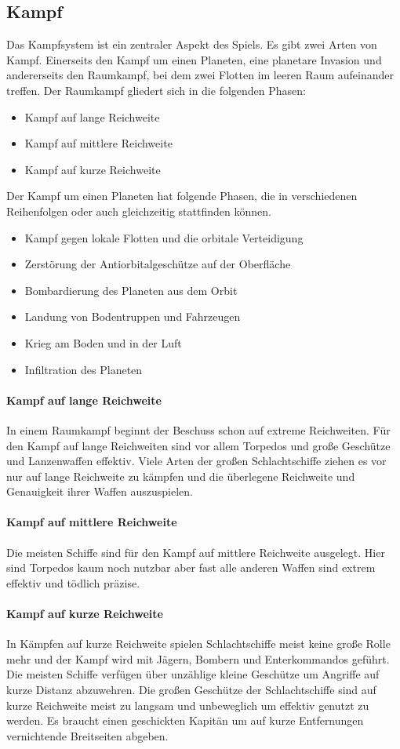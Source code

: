 \documentclass[11pt, a4paper]{article}
\begin{document}
\subsection{Kampf}
Das Kampfsystem ist ein zentraler Aspekt des Spiels. Es gibt zwei Arten von Kampf. Einerseits den Kampf um 
einen Planeten, eine planetare Invasion und andererseits den Raumkampf, bei dem zwei Flotten im leeren Raum
aufeinander treffen. Der Raumkampf gliedert sich in die folgenden Phasen:
\begin{itemize}
    \item Kampf auf lange Reichweite
    \item Kampf auf mittlere Reichweite
    \item Kampf auf kurze Reichweite
\end{itemize}
%
Der Kampf um einen Planeten hat folgende Phasen, die in verschiedenen Reihenfolgen oder auch gleichzeitig
stattfinden können.
\begin{itemize}
    \item Kampf gegen lokale Flotten und die orbitale Verteidigung
    \item Zerstörung der Antiorbitalgeschütze auf der Oberfläche
    \item Bombardierung des Planeten aus dem Orbit
    \item Landung von Bodentruppen und Fahrzeugen
    \item Krieg am Boden und in der Luft
    \item Infiltration des Planeten
\end{itemize}
%
\paragraph{Kampf auf lange Reichweite}
In einem Raumkampf beginnt der Beschuss schon auf extreme Reichweiten. Für den Kampf auf lange Reichweiten
sind vor allem Torpedos und große Geschütze und Lanzenwaffen effektiv. Viele Arten der großen Schlachtschiffe
ziehen es vor nur auf lange Reichweite zu kämpfen und die überlegene Reichweite und Genauigkeit ihrer Waffen
auszuspielen. 
%
\paragraph{Kampf auf mittlere Reichweite}
Die meisten Schiffe sind für den Kampf auf mittlere Reichweite ausgelegt. Hier sind Torpedos kaum noch nutzbar
aber fast alle anderen Waffen sind extrem effektiv und tödlich präzise.
%
\paragraph{Kampf auf kurze Reichweite}
In Kämpfen auf kurze Reichweite spielen Schlachtschiffe meist keine große Rolle mehr und der Kampf wird mit
Jägern, Bombern und Enterkommandos geführt. Die meisten Schiffe verfügen über unzählige kleine Geschütze 
um Angriffe auf kurze Distanz abzuwehren. Die großen Geschütze der Schlachtschiffe sind auf kurze Reichweite
meist zu langsam und unbeweglich um effektiv genutzt zu werden. Es braucht einen geschickten Kapitän um auf
kurze Entfernungen vernichtende Breitseiten abgeben.
%
\end{document}
